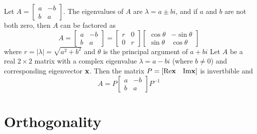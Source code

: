 \documentclass{article}
\begin{document}
\begin{outline}
            \1 Let \(A=\begin{bmatrix}
                a & -b \\ b & a
            \end{bmatrix}\). The eigenvalues of \(A\) are \(\lambda=a\pm bi\), and if \(a\) and \(b\) are not both zero, then $A$ can be factored as \[A=\begin{bmatrix}
                a & -b \\ b& a
            \end{bmatrix}=\begin{bmatrix}
                r & 0 \\ 0 & r
            \end{bmatrix}\begin{bmatrix}
                \cos\theta & -\sin\theta \\ \sin\theta & \cos\theta
            \end{bmatrix}\] where \(r=|\lambda|=\sqrt{a^2+b^2}\) and \(\theta\) is the principal argument of \(a+bi\)
            \1 Let $A$ be a real \(2\times 2\) matrix with a complex eigenvalue \(\lambda=a-bi\) (where \(b\neq 0\)) and corresponding eigenvector \(\vb x\). Then the matrix \(P=[\text{Re}\vb x\quad \text{Im}\vb x]\) is invertbible and \[A=P\begin{bmatrix}
                a & -b \\ b & a
            \end{bmatrix}P^{-1}\]
        \end{outline}
    \section{Orthogonality} %
\end{document}
